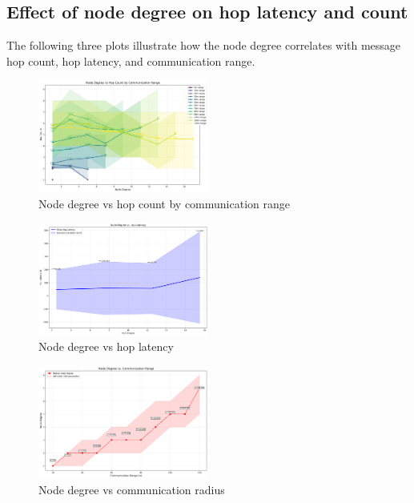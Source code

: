 \subsection{Effect of node degree on hop latency and count}
The following three plots illustrate how the node degree correlates with message hop count, hop latency, and communication range.

\begin{figure}
    \centering
    \includegraphics[width=0.5\textwidth]{plots/node_degree_vs_hop_count.png}
    \caption{Node degree vs hop count by communication range}
    \label{fig:node-degree-vs-hop-count}
\end{figure}

\begin{figure}
    \centering
    \includegraphics[width=0.5\textwidth]{plots/node_degree_vs_hoplatency.png}
    \caption{Node degree vs hop latency}
    \label{fig:node-degree-vs-hoplatency}
\end{figure}

\begin{figure}
    \centering
    \includegraphics[width=0.5\textwidth]{plots/node_degree_vs_communication_radius.png}
    \caption{Node degree vs communication radius}
    \label{fig:node-degree-vs-communication-radius}
\end{figure}

